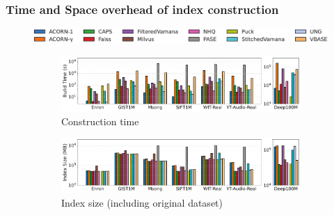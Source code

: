 \documentclass[sigconf, nonacm]{acmart}
\begin{document}
	\subsubsection{Time and Space overhead of index construction}
	\begin{figure}[t]
		\centering
		
		
		\hspace*{8pt} %
		\includegraphics[width=0.95\columnwidth]{figures/indexData/legend_only.pdf} %
		
		
		\begin{subfigure}{\columnwidth}
			\centering
			
			\includegraphics[width=0.99\linewidth]{figures/indexData/exp_7_build_time_comparison_query1.pdf}
			\caption{Construction time}
			\label{fig:build_time_comparison_query1}
		\end{subfigure}
		
		
		
		\begin{subfigure}{\columnwidth}
			\centering
			
			\includegraphics[width=0.99\linewidth]{figures/indexData/exp_7_index_size_mb_comparison_query1.pdf}
			\caption{Index size (including original dataset)}
			\label{fig:index_size_mb_comparison_query1}
		\end{subfigure}
		
		
		
		\begin{subfigure}{\columnwidth}
			\centering
			

\end{subfigure}
\end{figure}
\end{document}

